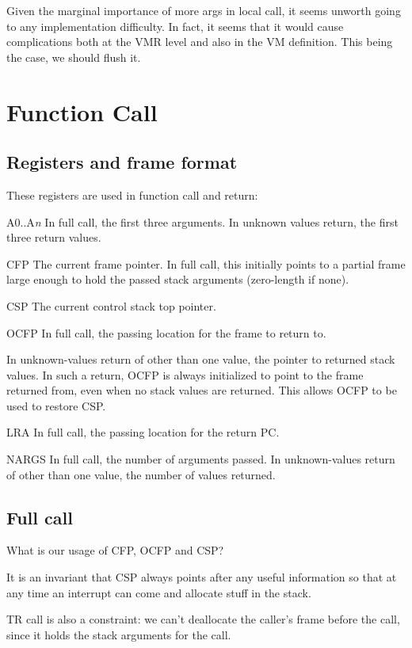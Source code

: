 Given the marginal importance of more args in local call, it seems unworth
going to any implementation difficulty.  In fact, it seems that it would cause
complications both at the VMR level and also in the VM definition.  This being
the case, we should flush it.


\section{Function Call}



\subsection{Registers and frame format}

These registers are used in function call and return:

A0..A{\it n}
    In full call, the first three arguments.  In unknown values return, the
    first three return values.

CFP
    The current frame pointer.  In full call, this initially points to a
    partial frame large enough to hold the passed stack arguments (zero-length
    if none).

CSP
    The current control stack top pointer. 

OCFP
    In full call, the passing location for the frame to return to.

    In unknown-values return of other than one value, the pointer to returned
    stack values.  In such a return, OCFP is always initialized to point to
    the frame returned from, even when no stack values are returned.  This
    allows OCFP to be used to restore CSP.

LRA
    In full call, the passing location for the return PC.

NARGS
    In full call, the number of arguments passed.  In unknown-values return of
    other than one value, the number of values returned.


\subsection{Full call}

What is our usage of CFP, OCFP and CSP?  

It is an invariant that CSP always points after any useful information so that
at any time an interrupt can come and allocate stuff in the stack.

TR call is also a constraint: we can't deallocate the caller's frame before the
call, since it holds the stack arguments for the call.  

